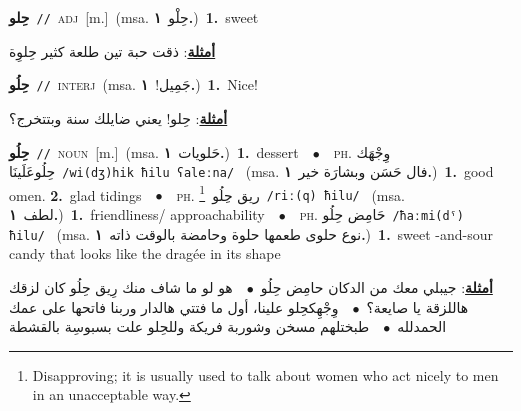 \documentclass[10pt,a4paper,twoside]{article} %
\begin{document}
\begin{multicols}{2}
{\setlength\topsep{0pt}\textbf{\foreignlanguage{arabic}{حِلو}}\ {\color{gray}\texttt{//}\color{black}}\ \textsc{adj}\ [m.]\ \color{gray}(msa. \foreignlanguage{arabic}{حِلْو}~\foreignlanguage{arabic}{\textbf{١.}})\color{black}\ \textbf{1.}~sweet\  \begin{flushright}\color{gray}\foreignlanguage{arabic}{\textbf{\underline{\foreignlanguage{arabic}{أمثلة}}}: ذقت حبة تين طلعة كثير حِلوِة}\end{flushright}\color{black}} \vspace{2mm}

{\setlength\topsep{0pt}\textbf{\foreignlanguage{arabic}{حِلُو}}\ {\color{gray}\texttt{//}\color{black}}\ \textsc{interj}\ \color{gray}(msa. \foreignlanguage{arabic}{جَمِيل!}~\foreignlanguage{arabic}{\textbf{١.}})\color{black}\ \textbf{1.}~Nice!\  \begin{flushright}\color{gray}\foreignlanguage{arabic}{\textbf{\underline{\foreignlanguage{arabic}{أمثلة}}}: حِلو! يعني ضايلك سنة وبتتخرج؟}\end{flushright}\color{black}} \vspace{2mm}

{\setlength\topsep{0pt}\textbf{\foreignlanguage{arabic}{حِلُو}}\ {\color{gray}\texttt{//}\color{black}}\ \textsc{noun}\ [m.]\ \color{gray}(msa. \foreignlanguage{arabic}{حَلويات}~\foreignlanguage{arabic}{\textbf{١.}})\color{black}\ \textbf{1.}~dessert\ \ $\bullet$\ \ \textsc{ph.} \color{gray} \foreignlanguage{arabic}{وِجْهَك حِلُوعَلَينَا}\color{black}\ {\color{gray}\texttt{/{\sffamily wi(dʒ)hik ħilu ʕaleːna}/}\color{black}}\ \color{gray} (msa. \foreignlanguage{arabic}{فال حَسَن وبشارَة خير}~\foreignlanguage{arabic}{\textbf{١.}})\color{black}\ \textbf{1.}~good omen.  \textbf{2.}~glad tidings\ \ $\bullet$\ \ \textsc{ph.} \color{gray} \foreignlanguage{arabic}{ريق حِلُو}\color{black}\ \footnote{Disapproving; it is usually used to talk about women who act nicely to men in an unacceptable way.}\ {\color{gray}\texttt{/{\sffamily riː(q) ħilu}/}\color{black}}\ \color{gray} (msa. \foreignlanguage{arabic}{لطف}~\foreignlanguage{arabic}{\textbf{١.}})\color{black}\ \textbf{1.}~friendliness/ approachability\ \ $\bullet$\ \ \textsc{ph.} \color{gray} \foreignlanguage{arabic}{حَامِض حِلُو}\color{black}\ {\color{gray}\texttt{/{\sffamily ħaːmi(dˤ) ħilu}/}\color{black}}\ \color{gray} (msa. \foreignlanguage{arabic}{نوع حلوى طعمها حلوة وحامضة بالوقت ذاته}~\foreignlanguage{arabic}{\textbf{١.}})\color{black}\ \textbf{1.}~sweet -and-sour candy that looks like the dragée in its shape\  \begin{flushright}\color{gray}\foreignlanguage{arabic}{\textbf{\underline{\foreignlanguage{arabic}{أمثلة}}}: جيبلي معك من الدكان حامِض حِلُو\ $\bullet$\ \  هو لو ما شاف منك رِيق حِلُو كان لزقك هاللزقة يا صايعة؟\ $\bullet$\ \  وِجْهِكحِلو علينا، أول ما فتتي هالدار وربنا فاتحها على عمك الحمدلله\ $\bullet$\ \  طبختلهم مسخن وشوربة فريكة وللحِلو علت بسبوسِة بالقشطة}\end{flushright}\color{black}} \vspace{2mm}


\end{multicols}
\end{document}
